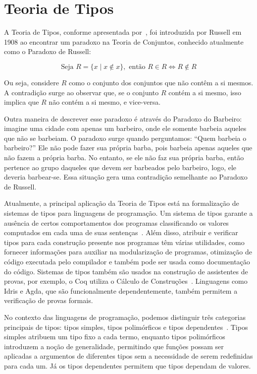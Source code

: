 \section{Teoria de Tipos}\label{sec:type-theory}

A Teoria de Tipos, conforme apresentada por~\cite{COQUAND2022}, foi introduzida por Russell em 1908 ao encontrar um paradoxo na Teoria de Conjuntos, conhecido atualmente como o Paradoxo de Russell:

\begin{equation}\label{eq:russell-paradox}
  \text{Seja } R = \{ x \mid x \notin x \}, \text{ então } R \in R \iff R \notin R
\end{equation}

Ou seja, considere $R$ como o conjunto dos conjuntos que não contêm a si mesmos.
A contradição surge ao observar que, se o conjunto $R$ contém a si mesmo, isso implica que $R$ não contém a si mesmo, e vice-versa.

Outra maneira de descrever esse paradoxo é através do Paradoxo do Barbeiro: imagine uma cidade com apenas um barbeiro, onde ele somente barbeia aqueles que não se barbeiam.
O paradoxo surge quando perguntamos: ``Quem barbeia o barbeiro?''
Ele não pode fazer sua própria barba, pois barbeia apenas aqueles que não fazem a própria barba.
No entanto, se ele não faz sua própria barba, então pertence ao grupo daqueles que devem ser barbeados pelo barbeiro, logo, ele deveria barbear-se.
Essa situação gera uma contradição semelhante ao Paradoxo de Russell.

Atualmente, a principal aplicação da Teoria de Tipos está na formalização de sistemas de tipos para linguagens de programação.
Um sistema de tipos garante a ausência de certos comportamentos dos programas classificando os valores computados em cada uma de suas sentenças~\cite{PIERCE2002}.
Além disso, atribuir e verificar tipos para cada construção presente nos programas têm várias utilidades, como fornecer informações para auxiliar na modularização de programas, otimização de código executada pelo compilador e também pode ser usada como documentação do código.
Sistemas de tipos também são usados na construção de assistentes de provas, por exemplo, o Coq utiliza o Cálculo de Construções~\cite{COQUAND1998}.
Linguagens como Idris e Agda, que são funcionalmente dependentemente, também permitem a verificação de provas formais.

No contexto das linguagens de programação, podemos distinguir três categorias principais de tipos: tipos simples, tipos polimórficos e tipos dependentes~\cite{PIERCE2002}.
Tipos simples atribuem um tipo fixo a cada termo, enquanto tipos polimórficos introduzem a noção de generalidade, permitindo que funções possam ser aplicadas a argumentos de diferentes tipos sem a necessidade de serem redefinidas para cada um.
Já os tipos dependentes permitem que tipos dependam de valores.

